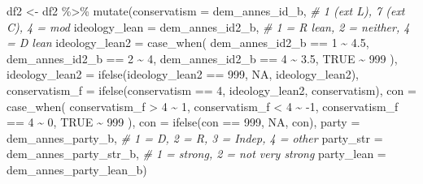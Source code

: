 \documentclass[
]{article}
\newenvironment{Shaded}{\begin{snugshade}}{\end{snugshade}}
\newcommand{\AttributeTok}[1]{\textcolor[rgb]{0.77,0.63,0.00}{#1}}
\newcommand{\CommentTok}[1]{\textcolor[rgb]{0.56,0.35,0.01}{\textit{#1}}}
\newcommand{\ConstantTok}[1]{\textcolor[rgb]{0.00,0.00,0.00}{#1}}
\newcommand{\DecValTok}[1]{\textcolor[rgb]{0.00,0.00,0.81}{#1}}
\newcommand{\FloatTok}[1]{\textcolor[rgb]{0.00,0.00,0.81}{#1}}
\newcommand{\FunctionTok}[1]{\textcolor[rgb]{0.00,0.00,0.00}{#1}}
\newcommand{\NormalTok}[1]{#1}
\newcommand{\OtherTok}[1]{\textcolor[rgb]{0.56,0.35,0.01}{#1}}
\newcommand{\SpecialCharTok}[1]{\textcolor[rgb]{0.00,0.00,0.00}{#1}}
\begin{document}
\begin{Shaded}
\begin{Highlighting}[]
\NormalTok{df2 }\OtherTok{\textless{}{-}}\NormalTok{ df2 }\SpecialCharTok{\%\textgreater{}\%} 
  \FunctionTok{mutate}\NormalTok{(}\AttributeTok{conservatism =}\NormalTok{ dem\_annes\_id\_b, }\CommentTok{\# 1 (ext L), 7 (ext C), 4 = mod}
         \AttributeTok{ideology\_lean =}\NormalTok{ dem\_annes\_id2\_b, }\CommentTok{\# 1 = R lean, 2 = neither, 4 = D lean}
         \AttributeTok{ideology\_lean2 =} \FunctionTok{case\_when}\NormalTok{(}
\NormalTok{           dem\_annes\_id2\_b }\SpecialCharTok{==} \DecValTok{1} \SpecialCharTok{\textasciitilde{}} \FloatTok{4.5}\NormalTok{,}
\NormalTok{           dem\_annes\_id2\_b }\SpecialCharTok{==} \DecValTok{2} \SpecialCharTok{\textasciitilde{}} \DecValTok{4}\NormalTok{,}
\NormalTok{           dem\_annes\_id2\_b }\SpecialCharTok{==} \DecValTok{4} \SpecialCharTok{\textasciitilde{}} \FloatTok{3.5}\NormalTok{,}
           \ConstantTok{TRUE} \SpecialCharTok{\textasciitilde{}} \DecValTok{999}
\NormalTok{         ),}
         \AttributeTok{ideology\_lean2 =} \FunctionTok{ifelse}\NormalTok{(ideology\_lean2 }\SpecialCharTok{==} \DecValTok{999}\NormalTok{, }\ConstantTok{NA}\NormalTok{, ideology\_lean2),}
         \AttributeTok{conservatism\_f =} \FunctionTok{ifelse}\NormalTok{(conservatism }\SpecialCharTok{==} \DecValTok{4}\NormalTok{, ideology\_lean2, conservatism),}
         \AttributeTok{con =} \FunctionTok{case\_when}\NormalTok{(}
\NormalTok{           conservatism\_f }\SpecialCharTok{\textgreater{}} \DecValTok{4} \SpecialCharTok{\textasciitilde{}} \DecValTok{1}\NormalTok{,}
\NormalTok{           conservatism\_f }\SpecialCharTok{\textless{}} \DecValTok{4} \SpecialCharTok{\textasciitilde{}} \SpecialCharTok{{-}}\DecValTok{1}\NormalTok{,}
\NormalTok{           conservatism\_f }\SpecialCharTok{==} \DecValTok{4} \SpecialCharTok{\textasciitilde{}} \DecValTok{0}\NormalTok{,}
           \ConstantTok{TRUE} \SpecialCharTok{\textasciitilde{}} \DecValTok{999}
\NormalTok{         ),}
         \AttributeTok{con =} \FunctionTok{ifelse}\NormalTok{(con }\SpecialCharTok{==} \DecValTok{999}\NormalTok{, }\ConstantTok{NA}\NormalTok{, con),}
         \AttributeTok{party =}\NormalTok{ dem\_annes\_party\_b, }\CommentTok{\# 1 = D, 2 = R, 3 = Indep, 4 = other}
         \AttributeTok{party\_str =}\NormalTok{ dem\_annes\_party\_str\_b, }\CommentTok{\# 1 = strong, 2 = not very strong}
         \AttributeTok{party\_lean =}\NormalTok{ dem\_annes\_party\_lean\_b) }
\end{Highlighting}
\end{Shaded}
\end{document}
